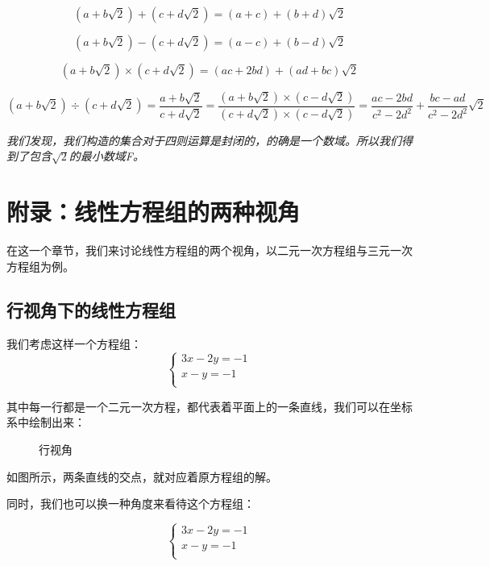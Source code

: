 \documentclass[a4paper]{ctexart}
\begin{document}
$$
(a+b\sqrt{2})+(c+d\sqrt{2})=(a+c)+(b+d)\sqrt{2}
$$

$$
(a+b\sqrt{2})-(c+d\sqrt{2})=(a-c)+(b-d)\sqrt{2}
$$

$$
(a+b\sqrt{2})\times(c+d\sqrt{2})=(ac+2bd)+(ad+bc)\sqrt{2}
$$

$$
(a+b\sqrt{2})\div(c+d\sqrt{2})=\frac{a+b\sqrt{2}}{c+d\sqrt{2}}=\frac{(a+b\sqrt{2})\times(c-d\sqrt{2})}{(c+d\sqrt{2})\times(c-d\sqrt{2})}=\frac{ac-2bd}{c^2-2d^2}+\frac{bc-ad}{c^2-2d^2}\sqrt{2}
$$

\textit{我们发现，我们构造的集合对于四则运算是封闭的，的确是一个数域。所以我们得到了包含$\sqrt{2}$的最小数域F。}

\section{附录：线性方程组的两种视角}
在这一个章节，我们来讨论线性方程组的两个视角，以二元一次方程组与三元一次方程组为例。

\subsection{行视角下的线性方程组}
我们考虑这样一个方程组：
$$
\begin{cases}
3x-2y=-1\\
x-y=-1\\
\end{cases}
$$

其中每一行都是一个二元一次方程，都代表着平面上的一条直线，我们可以在坐标系中绘制出来：

\begin{figure}[htp]
\centering
{}
\caption{行视角}
\end{figure}

如图所示，两条直线的交点，就对应着原方程组的解。

同时，我们也可以换一种角度来看待这个方程组：

$$
\begin{cases}
3x-2y=-1\\
x-y=-1\\
\end{cases}
$$
\end{document}
